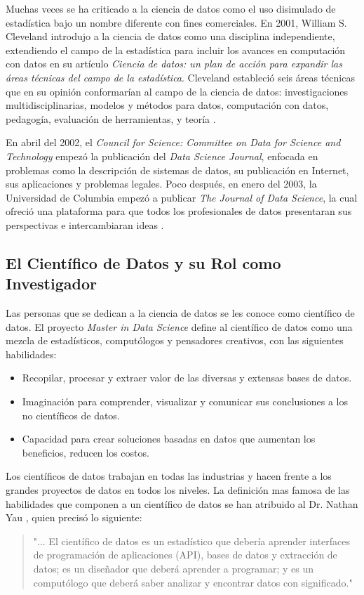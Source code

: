 Muchas veces se ha criticado a la ciencia de datos como el uso disimulado de estadística bajo un nombre diferente con fines comerciales. En 2001, William S. Cleveland introdujo a la ciencia de datos como una disciplina independiente, extendiendo el campo de la estadística para incluir los avances en computación con datos en su artículo \textit{Ciencia de datos: un plan de acción para expandir las áreas técnicas del campo de la estadística}. Cleveland estableció seis áreas técnicas que en su opinión conformarían al campo de la ciencia de datos: investigaciones multidisciplinarias, modelos y métodos para datos, computación con datos, pedagogía, evaluación de herramientas, y teoría \cite{cleveland}.

En abril del 2002, el \textit{ Council for Science: Committee on Data for Science and Technology} \cite{CODATA} empezó la publicación del \textit{Data Science Journal}, enfocada en problemas como la descripción de sistemas de datos, su publicación en Internet, sus aplicaciones y problemas legales. Poco después, en enero del 2003, la Universidad de Columbia empezó a publicar \textit{The Journal of Data Science}, la cual ofreció una plataforma para que todos los profesionales de datos presentaran sus perspectivas e intercambiaran ideas \cite{wikipediaDS}.

\subsection{El Científico de Datos y su Rol como Investigador}
Las personas que se dedican a la ciencia de datos se les conoce como científico de datos. El proyecto \textit{Master in Data Science} define al científico de datos como una mezcla de estadísticos, computólogos y pensadores creativos, con las siguientes habilidades:

\begin{itemize}
	\item Recopilar, procesar y extraer valor de las diversas y extensas bases de datos.
	\item Imaginación para comprender, visualizar y comunicar sus conclusiones a los no científicos de datos.
	\item Capacidad para crear soluciones basadas en datos que aumentan los beneficios, reducen los costos.
\end{itemize}

Los científicos de datos trabajan en todas las industrias y hacen frente a los grandes proyectos de datos en todos los niveles. La definición mas famosa de las habilidades que componen a un científico de datos se han atribuido al Dr. Nathan Yau \cite{yau}, quien precisó lo siguiente: \begin{quote} "... El científico de datos es un estadístico que debería aprender interfaces de programación de aplicaciones (API), bases de datos y extracción de datos; es un diseñador que deberá aprender a programar; y es un computólogo que deberá saber analizar y encontrar datos con significado." \end{quote}

